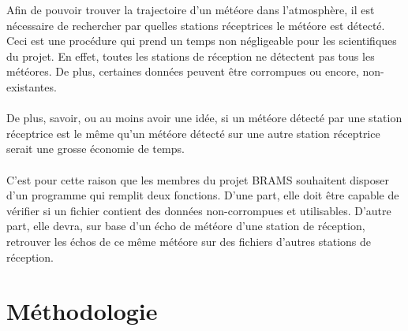 \documentclass[11pt]{article}
\begin{document}
Afin de pouvoir trouver la trajectoire d'un météore dans l'atmosphère, il est nécessaire de rechercher par quelles stations réceptrices le météore est détecté.
Ceci est une procédure qui prend un temps non négligeable pour les scientifiques du projet.
En effet, toutes les stations de réception ne détectent pas tous les météores.
De plus, certaines données peuvent être corrompues ou encore, non-existantes.\\
\\
De plus, savoir, ou au moins avoir une idée, si un météore détecté par une station réceptrice est le même qu'un météore détecté sur une autre station réceptrice serait une grosse économie de temps.\\
\\
C'est pour cette raison que les membres du projet BRAMS souhaitent disposer d'un programme qui remplit deux fonctions.
D'une part, elle doit être capable de vérifier si un fichier contient des données non-corrompues et utilisables.
D'autre part, elle devra, sur base d'un écho de météore d'une station de réception, retrouver les échos de ce même météore sur des fichiers d'autres stations de réception.

\newpage

\section{Méthodologie}
\end{document}
